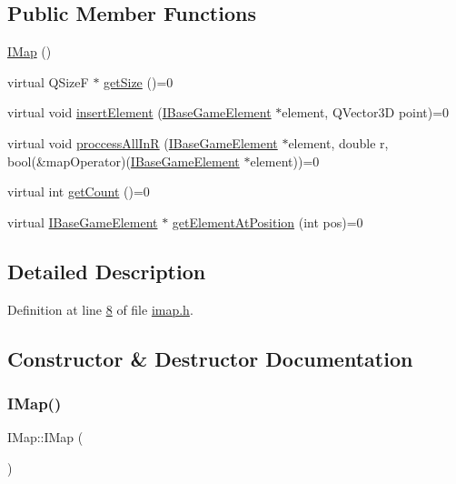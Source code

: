 \subsection*{Public Member Functions}
\begin{DoxyCompactItemize}
\item 
\hyperlink{a00165_ac705a2e065b5c4604e43a44b488d798a}{I\+Map} ()
\item 
virtual Q\+SizeF $\ast$ \hyperlink{a00165_a183f2d7ba8ec154d0338e999f195d0c8}{get\+Size} ()=0
\item 
virtual void \hyperlink{a00165_a2d44fb3d3798e08bebcd25ad5f1787f4}{insert\+Element} (\hyperlink{a00137}{I\+Base\+Game\+Element} $\ast$element, Q\+Vector3D point)=0
\item 
virtual void \hyperlink{a00165_aa4feb51c5d024c99d4c57ccf5d2ff82d}{proccess\+All\+InR} (\hyperlink{a00137}{I\+Base\+Game\+Element} $\ast$element, double r, bool(\&map\+Operator)(\hyperlink{a00137}{I\+Base\+Game\+Element} $\ast$element))=0
\item 
virtual int \hyperlink{a00165_a021e64b05ecb6558ed1d663676f82971}{get\+Count} ()=0
\item 
virtual \hyperlink{a00137}{I\+Base\+Game\+Element} $\ast$ \hyperlink{a00165_a9fce1fb4ad8fac181fbbce3ce31da0a0}{get\+Element\+At\+Position} (int pos)=0
\end{DoxyCompactItemize}


\subsection{Detailed Description}


Definition at line \hyperlink{a00053_source_l00008}{8} of file \hyperlink{a00053_source}{imap.\+h}.



\subsection{Constructor \& Destructor Documentation}
\mbox{\label{a00165_ac705a2e065b5c4604e43a44b488d798a}} 
\subsubsection{\texorpdfstring{I\+Map()}{IMap()}}
{\footnotesize\ttfamily I\+Map\+::\+I\+Map (\begin{DoxyParamCaption}{ }\end{DoxyParamCaption})}



